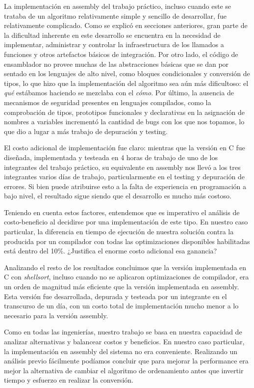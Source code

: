 \documentclass[a4paper,11pt]{article}
\begin{document}
La implementación en assembly del trabajo práctico, incluso cuando este se
trataba de un algoritmo relativamente simple y sencillo de desarrollar, fue
relativamente complicado. Como se explicó en secciones anteriores, gran parte
de la dificultad inherente en este desarrollo se encuentra en la necesidad de
implementar, administrar y controlar la infraestructura de los llamados a
funciones y otros artefactos básicos de integración. Por otro lado, el código
de ensamblador no provee muchas de las abstracciones básicas que se dan por
sentado en los lenguajes de alto nivel, como bloques condicionales y conversión
de tipos, lo que hizo que la implementación del algoritmo sea aún más
dificultoso: el \textit{qué} estábamos haciendo se mezclaba con el
\textit{cómo}. Por último, la ausencia de mecanismos de seguridad presentes en
lenguajes compilados, como la comprobación de tipos, prototipos funcionales y
declarativas en la asignación de nombres a variables incrementó la cantidad
de bugs con los que nos topamos, lo que dio a lugar a más trabajo de depuración
y testing.

El costo adicional de implementación fue claro: mientras que la versión en C
fue diseñada, implementada y testeada en 4 horas de trabajo de uno de los
integrantes del trabajo práctico, su equivalente en assembly nos llevó a los tres
integrantes varios días de trabajo, particularmente en el testing y depuración
de errores. Si bien puede atribuirse esto a la falta de experiencia en
programación a bajo nivel, el resultado sigue siendo que el desarrollo es mucho
más costoso.

Teniendo en cuenta estos factores, entendemos que es imperativo el análisis de
costo-beneficio al decidirse por una implementación de este tipo. En nuestro
caso particular, la diferencia en tiempo de ejecución de nuestra solución
contra la producida por un compilador con todas las optimizaciones disponibles
habilitadas está dentro del 10\%. ¿Justifica el enorme costo adicional esa
ganancia?

Analizando el resto de los resultados concluimos que la versión implementada en
C con \textit{shellsort}, incluso cuando no se aplicaron optimizaciones de
compilador, era un orden de magnitud más eficiente que la versión implementada
en assembly. Esta versión fue desarrollada, depurada y testeada por un
integrante en el transcurso de un día, con un costo total de implementación
mucho menor a lo necesario para la versión assembly.

Como en todas las ingenierías, nuestro trabajo se basa en nuestra capacidad de
analizar alternativas y balancear costos y beneficios. En nuestro caso
particular, la implementación en assembly del sistema no era conveniente.
Realizando un análisis previo fácilmente podíamos concluir que para mejorar la
performance era mejor la alternativa de cambiar el algoritmo de ordenamiento
antes que invertir tiempo y esfuerzo en realizar la conversión.
\end{document}
